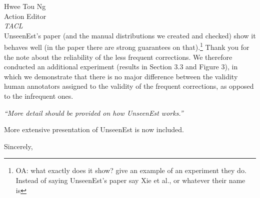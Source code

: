 \documentclass[11pt,letterpaper]{letter}
\newcommand{\oa}[1]{\footnote{\color{red}OA: #1}}
\begin{document}
\begin{letter}{%
Hwee Tou Ng\\
Action Editor\\
{\em TACL}\\
}
UnseenEst's paper (and the manual distributions we created and checked) show it behaves well (in the paper there are strong guarantees on that).\oa{what exactly does it show? give an example of an experiment they do. Instead of saying UnseenEst's paper say Xie et al., or whatever their name is}
Thank you for the note about the reliability of the less frequent corrections. We therefore conducted an additional experiment (results in Section 3.3 and Figure 3), in which we demonstrate that there is no major difference between the validity human annotators assigned to the validity of the frequent corrections, as opposed to the infrequent ones.
		
\emph{``More detail should be provided on how UnseenEst works.''}
		
More extensive presentation of UnseenEst is now included. 

\closing{Sincerely,}

\end{letter}
\end{document}
